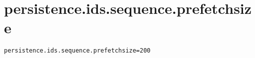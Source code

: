 \section{persistence.ids.sequence.prefetchsize}
\label{configuration:PersistenceIdsSequencePrefetchsize}
\AvailableInJavaOnly{\TODO}
\begin{lstlisting}[style=Props,caption={Usage example for \textit{persistence.ids.sequence.prefetchsize}}]
persistence.ids.sequence.prefetchsize=200
\end{lstlisting}